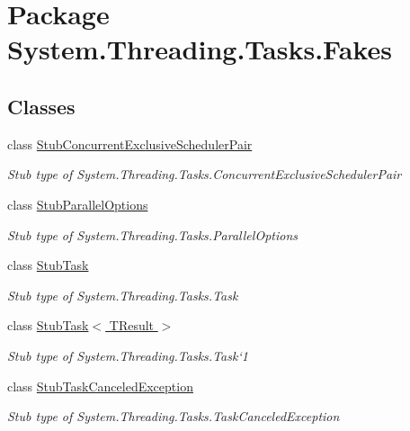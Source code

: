\hypertarget{namespace_system_1_1_threading_1_1_tasks_1_1_fakes}{\section{Package System.\-Threading.\-Tasks.\-Fakes}
\label{namespace_system_1_1_threading_1_1_tasks_1_1_fakes}
}
\subsection*{Classes}
\begin{DoxyCompactItemize}
\item 
class \hyperlink{class_system_1_1_threading_1_1_tasks_1_1_fakes_1_1_stub_concurrent_exclusive_scheduler_pair}{Stub\-Concurrent\-Exclusive\-Scheduler\-Pair}
\begin{DoxyCompactList}\small\item\em Stub type of System.\-Threading.\-Tasks.\-Concurrent\-Exclusive\-Scheduler\-Pair\end{DoxyCompactList}\item 
class \hyperlink{class_system_1_1_threading_1_1_tasks_1_1_fakes_1_1_stub_parallel_options}{Stub\-Parallel\-Options}
\begin{DoxyCompactList}\small\item\em Stub type of System.\-Threading.\-Tasks.\-Parallel\-Options\end{DoxyCompactList}\item 
class \hyperlink{class_system_1_1_threading_1_1_tasks_1_1_fakes_1_1_stub_task}{Stub\-Task}
\begin{DoxyCompactList}\small\item\em Stub type of System.\-Threading.\-Tasks.\-Task\end{DoxyCompactList}\item 
class \hyperlink{class_system_1_1_threading_1_1_tasks_1_1_fakes_1_1_stub_task_3_01_t_result_01_4}{Stub\-Task$<$ T\-Result $>$}
\begin{DoxyCompactList}\small\item\em Stub type of System.\-Threading.\-Tasks.\-Task`1\end{DoxyCompactList}\item 
class \hyperlink{class_system_1_1_threading_1_1_tasks_1_1_fakes_1_1_stub_task_canceled_exception}{Stub\-Task\-Canceled\-Exception}
\begin{DoxyCompactList}\small\item\em Stub type of System.\-Threading.\-Tasks.\-Task\-Canceled\-Exception\end{DoxyCompactList}\item 

\end{DoxyCompactItemize}
